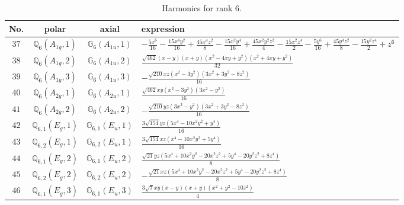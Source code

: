 \documentclass[fleqn,8pt,landscape]{jsarticle}
\begin{document}
\begin{table}[ht!]
\begin{center}
\caption{Harmonics for rank 6.}
\renewcommand{\arraystretch}{1.3}
\begin{tabular}{cccl} \hline \hline
No. & polar & axial & expression \\ \hline
$ 37 $ & $ \mathbb{Q}_{6}(A_{1g},1) $ & $ \mathbb{G}_{6}(A_{1u},1) $ & $ - \frac{5 x^{6}}{16} - \frac{15 x^{4} y^{2}}{16} + \frac{45 x^{4} z^{2}}{8} - \frac{15 x^{2} y^{4}}{16} + \frac{45 x^{2} y^{2} z^{2}}{4} - \frac{15 x^{2} z^{4}}{2} - \frac{5 y^{6}}{16} + \frac{45 y^{4} z^{2}}{8} - \frac{15 y^{2} z^{4}}{2} + z^{6} $ \\
$ 38 $ & $ \mathbb{Q}_{6}(A_{1g},2) $ & $ \mathbb{G}_{6}(A_{1u},2) $ & $ \frac{\sqrt{462} \left(x - y\right) \left(x + y\right) \left(x^{2} - 4 x y + y^{2}\right) \left(x^{2} + 4 x y + y^{2}\right)}{32} $ \\
$ 39 $ & $ \mathbb{Q}_{6}(A_{1g},3) $ & $ \mathbb{G}_{6}(A_{1u},3) $ & $ - \frac{\sqrt{210} x z \left(x^{2} - 3 y^{2}\right) \left(3 x^{2} + 3 y^{2} - 8 z^{2}\right)}{16} $ \\
$ 40 $ & $ \mathbb{Q}_{6}(A_{2g},1) $ & $ \mathbb{G}_{6}(A_{2u},1) $ & $ \frac{\sqrt{462} x y \left(x^{2} - 3 y^{2}\right) \left(3 x^{2} - y^{2}\right)}{16} $ \\
$ 41 $ & $ \mathbb{Q}_{6}(A_{2g},2) $ & $ \mathbb{G}_{6}(A_{2u},2) $ & $ - \frac{\sqrt{210} y z \left(3 x^{2} - y^{2}\right) \left(3 x^{2} + 3 y^{2} - 8 z^{2}\right)}{16} $ \\
$ 42 $ & $ \mathbb{Q}_{6,1}(E_{g},1) $ & $ \mathbb{G}_{6,1}(E_{u},1) $ & $ \frac{3 \sqrt{154} y z \left(5 x^{4} - 10 x^{2} y^{2} + y^{4}\right)}{16} $ \\
$ 43 $ & $ \mathbb{Q}_{6,2}(E_{g},1) $ & $ \mathbb{G}_{6,2}(E_{u},1) $ & $ \frac{3 \sqrt{154} x z \left(x^{4} - 10 x^{2} y^{2} + 5 y^{4}\right)}{16} $ \\
$ 44 $ & $ \mathbb{Q}_{6,1}(E_{g},2) $ & $ \mathbb{G}_{6,1}(E_{u},2) $ & $ \frac{\sqrt{21} y z \left(5 x^{4} + 10 x^{2} y^{2} - 20 x^{2} z^{2} + 5 y^{4} - 20 y^{2} z^{2} + 8 z^{4}\right)}{8} $ \\
$ 45 $ & $ \mathbb{Q}_{6,2}(E_{g},2) $ & $ \mathbb{G}_{6,2}(E_{u},2) $ & $ - \frac{\sqrt{21} x z \left(5 x^{4} + 10 x^{2} y^{2} - 20 x^{2} z^{2} + 5 y^{4} - 20 y^{2} z^{2} + 8 z^{4}\right)}{8} $ \\
$ 46 $ & $ \mathbb{Q}_{6,1}(E_{g},3) $ & $ \mathbb{G}_{6,1}(E_{u},3) $ & $ \frac{3 \sqrt{7} x y \left(x - y\right) \left(x + y\right) \left(x^{2} + y^{2} - 10 z^{2}\right)}{4} $ \\

\end{tabular}
\end{center}
\end{table}
\end{document}
